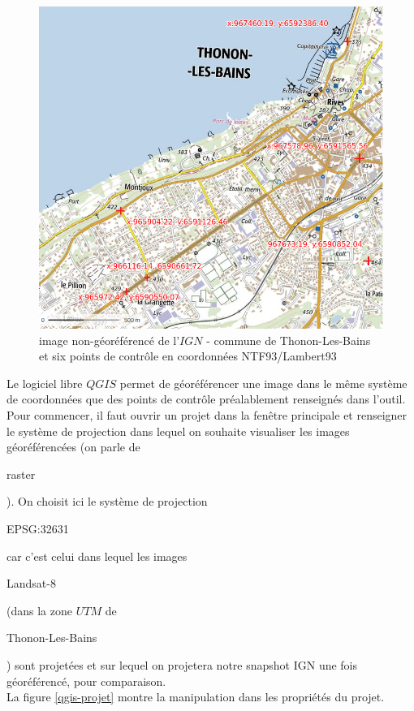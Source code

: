 \documentclass{book}
\begin{document}
\begin{figure}[H]
\begin{center}
\includegraphics[scale=0.5]{images/georeferencing/ign-points-Thonon.png}
\end{center}
\caption{image non-géoréférencé de l'$IGN$ - commune de Thonon-Les-Bains et six points de contr\^{o}le en coordonnées NTF93/Lambert93}
\label{ign-points}
\end{figure}

\clearpage

Le logiciel libre $QGIS$ \cite{QGIS_software} permet de géoréférencer une image dans le même système de coordonnées que des points de
contr\^{o}le préalablement renseignés dans l'outil.\\
Pour commencer, il faut ouvrir un projet dans la fen\^{e}tre principale et renseigner le système de projection dans lequel on souhaite visualiser
les images géoréférencées (on parle de \begin{itshape}raster\end{itshape}). On choisit ici le système de projection
\begin{itshape}EPSG:32631\end{itshape} car c'est celui dans lequel les images \begin{itshape}Landsat-8\end{itshape} (dans la zone $UTM$ 
de \begin{itshape}Thonon-Les-Bains\end{itshape}) sont projetées et
sur lequel on projetera notre snapshot IGN une fois géoréférencé, pour comparaison.\\
La figure \ref{qgis-projet} montre la manipulation dans les propriétés du projet.
\end{document}
